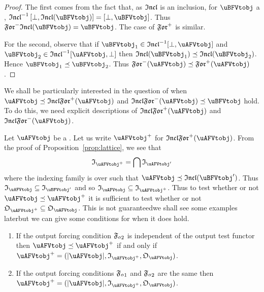 \documentclass[%
a4paper,%
arxiv,%
defaults
]{myclass}
\begin{document}
\begin{proof}
The first comes from the fact that, as \(\incfunc\) is an inclusion, for \(\uBFVtobj\) a \uBFVtobjalt, \(\incfunc^{-1} \left[\bot, \incfunc(\uBFVtobj)\right] = \left[\bot, \uBFVtobj\right]\).
Thus \(\Jforfunc \incfunc(\uBFVtobj) = \uBFVtobj\).
The case of \(\Mforfunc\) is similar.

For the second, observe that if \(\uBFVtobj_1 \in \incfunc^{-1} [\bot, \uAFVtobj]\) and \(\uBFVtobj_2 \in \incfunc^{-1} [\uAFVtobj, \bot]\) then \(\incfunc(\uBFVtobj_1) \preceq \incfunc(\uBFVtobj_2)\).
Hence \(\uBFVtobj_1 \preceq \uBFVtobj_2\).
Thus \(\Jforfunc(\uAFVtobj) \preceq \Mforfunc(\uAFVtobj)\).
\end{proof}

We shall be particularly interested in the question of when \(\uAFVtobj \preceq \incfunc \Mforfunc(\uAFVtobj)\) and \(\incfunc \Jforfunc(\uAFVtobj) \preceq \uBFVtobj\) hold.
To do this, we need explicit descriptions of \(\incfunc \Mforfunc(\uAFVtobj)\) and \(\incfunc \Jforfunc(\uAFVtobj)\).

Let \(\uAFVtobj\) be a \uAFVtobjalt.
Let us write \(\mMo{\uAFVtobj}\) for \(\incfunc\Mforfunc(\uAFVtobj)\).
From the proof of Proposition~\ref{prop:lattice}, we see that
%
\[
  \itest_{\mMo{\uAFVtobj}} = \bigcap \itest_{\uAFVtobj'}
\]
%
where the indexing family is over \uBFVtobjalts[\uBFVtobj'] such that \(\uAFVtobj \preceq \incfunc(\uBFVtobj')\).
Thus \(\itest_{\uAFVtobj} \subseteq \itest_{\uBFVtobj'}\) and so \(\itest_{\uAFVtobj} \subseteq \itest_{\mMo{\uAFVtobj}}\).
Thus to test whether or not \(\uAFVtobj \preceq \mMo{\uAFVtobj}\) it is sufficient to test whether or not \(\otest_{\mMo{\uAFVtobj}} \subseteq \otest_{\uAFVtobj}\).
This is not guaranteed\emhyp{}we shall see some examples later\emhyp{}but we can give some conditions for when it does hold.

\begin{proposition}
\label{prop:foradj}
\begin{enumerate}
\item If the output forcing condition \(\mBo{\oforce}\) is independent of the output test functor then \(\uAFVtobj \preceq \mMo{\uAFVtobj}\) if and only if \(\mMo{\uAFVtobj} = (\forfunc[\uAFVtobj], \itest_{\mMo{\uAFVtobj}}, \otest_{\uAFVtobj})\).
\item If the output forcing conditions \(\mAo{\oforce}\) and \(\mBo{\oforce}\) are the same then \(\mMo{\uAFVtobj} = (\forfunc[\uAFVtobj], \itest_{\mMo{\uAFVtobj}}, \otest_{\uAFVtobj})\).
\end{enumerate}
\end{proposition}
\end{document}
